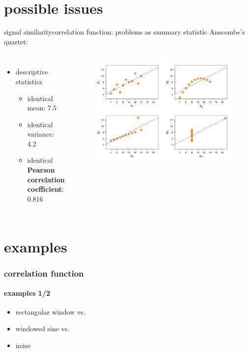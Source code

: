 \section{possible issues}
\begin{frame}{signal similarity}{correlation function: problems as summary statistic}
    Anscombe's quartet:
    \begin{columns}
    \begin{itemize}
        \item descriptive statistics
            \begin{itemize}
                \item   identical mean: 7.5
                \item   identical variance: 4.2
                \item   identical \textbf{Pearson correlation coefficient}: 0.816
            \end{itemize}
    \end{itemize}
    \begin{figure}
        \includegraphics[scale=.2]{graph/Anscombes_quartet}
    \end{figure}
    \end{columns}
\end{frame}

\section{examples}
\begin{frame}\frametitle{correlation function}\framesubtitle{examples 1/2}
			
		\begin{itemize}
			\item	rectangular window vs.
			\item	windowed sine vs.
			\item	noise
		\end{itemize}
\end{frame}

